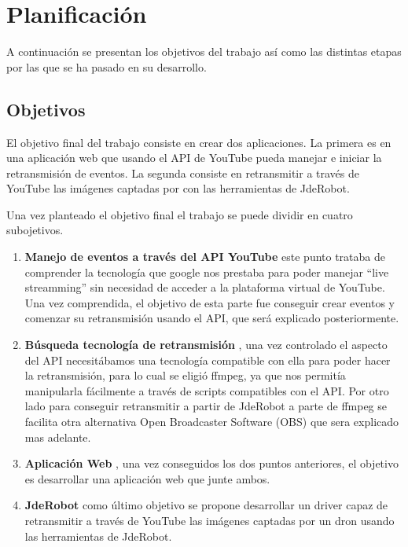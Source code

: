 \chapter{Planificación}

A continuación se presentan los objetivos del trabajo así como las distintas etapas por las que se ha pasado en su desarrollo.
\section{Objetivos}

El objetivo final del trabajo consiste en crear dos aplicaciones. La primera es en una aplicación web que usando el API de YouTube pueda manejar e iniciar la retransmisión de eventos. La segunda consiste en retransmitir a través de YouTube las imágenes captadas por con las herramientas de JdeRobot.

Una vez planteado el objetivo final el trabajo se puede dividir en cuatro subojetivos.

\begin{enumerate}
    \item \textbf {Manejo de eventos a través del API YouTube} este punto trataba de comprender la tecnología que google nos prestaba para poder manejar “live streamming” sin necesidad de acceder a la plataforma virtual de YouTube. Una vez comprendida, el objetivo de esta parte fue conseguir crear eventos y comenzar su retransmisión usando el API, que será explicado posteriormente.
    \item \textbf {Búsqueda tecnología de retransmisión} ,  una vez controlado el aspecto del API necesitábamos una tecnología compatible con ella para poder hacer la retransmisión, para lo cual se eligió ffmpeg, ya que nos permitía manipularla fácilmente a través de scripts compatibles con el API. Por otro lado para conseguir retransmitir a partir de JdeRobot a parte de ffmpeg  se facilita otra alternativa Open Broadcaster Software (OBS) que sera explicado mas adelante.
    \item \textbf {Aplicación Web} , una vez conseguidos los dos puntos anteriores, el objetivo es desarrollar una aplicación web que junte ambos.
    \item \textbf {JdeRobot} como último objetivo se propone desarrollar un driver capaz de retransmitir a través de YouTube las imágenes captadas por un dron usando las herramientas de JdeRobot.
    
\end{enumerate}

